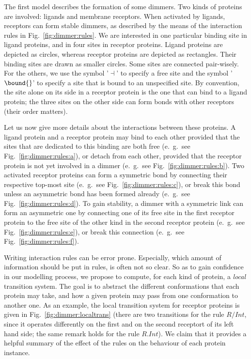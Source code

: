 \documentclass[10pt,a4paper]{llncs}
\newcommand{\freesymbol}{\dashv}
\newcommand{\eg}{e.~g.}
\begin{document}
The first model describes the formation of some dimmers. Two kinds of proteins are involved: ligands and membrane receptors. When activated by ligands, receptors can form stable dimmers, as described by the means of the interaction rules in Fig.~\ref{fig:dimmer:rules}.  We are interested in one particular binding site in ligand proteins, and in four sites in receptor proteins.  Ligand proteins are depicted as circles, whereas receptor proteins are depicted as rectangles. Their binding sites are drawn as smaller circles.
 Some sites are connected pair-wisely. For the others, we use the symbol '$\freesymbol$' to specify a free site and the symbol '$\bound{}$' to specify a site that is bound to an unspecified site.   By convention, the site alone on its side in a receptor protein is the one that can bind to a ligand protein; the three sites on the other side can form bonds with other receptors
 (their order  matters).

Let us now give more details about the interactions between these proteins.  A ligand protein and a receptor protein may bind to each other provided that the sites that are dedicated to this binding are both free (\eg~see Fig.~\ref{fig:dimmer:rules:a}), or detach from each other, provided that the receptor protein is not yet involved in a dimmer (\eg~see Fig.~\ref{fig:dimmer:rules:b}). Two activated receptor proteins  can form a symmetric bond by connecting their respective top-most site (\eg~see Fig.~\ref{fig:dimmer:rules:c}), or break this bond unless an asymmetric bond has been formed already (\eg~see Fig.~\ref{fig:dimmer:rules:d}). To gain stability, a dimmer with a symmetric link can form an asymmetric one by connecting one of its free site in the first receptor protein to the free site of the other kind in the second receptor protein  (\eg~see Fig.~\ref{fig:dimmer:rules:e}), or break this connection (\eg~see Fig.~\ref{fig:dimmer:rules:f}).

Writing interaction rules can be error prone. Especially, which amount of information should be put in rules, is often not so clear. So as to gain confidence in our modelling process, we propose to compute, for each kind of protein, a \emph{local} transition system.
The goal is to abstract the different conformations that each protein may take, and how a given protein may pass from one conformation to another one. As an example, the local transition system for receptor proteins is given in Fig.~\ref{fig:dimmer:localtrans} (there are two transitions for the  rule $R/Int$, since it operates differently  on the  first and on the second receptort of its left hand side; the same remark holds for the rule $R.Int$). We claim that it provides a helpful summary of the effect of the rules on the behaviour of each protein instance.
\end{document}
